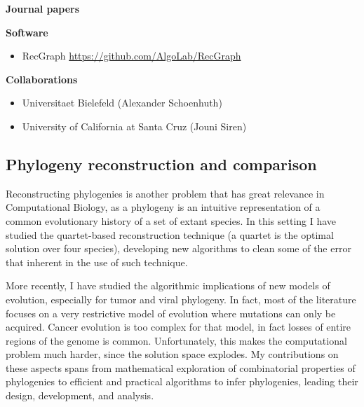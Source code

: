 \documentclass[11pt,a4paper,roman]{moderncv}
\begin{document}
\textbf{Journal papers}

\cite{baaijensComputationalGraphPangenomics2022}
\cite{DBLP:journals/bioinformatics/DentiPPCVRB21}
\cite{DBLP:journals/ipl/BonizzoniVDP10}
\cite{DBLP:journals/tcbb/BonizzoniVDFRV07}
\cite{DBLP:journals/informs/JustV04}
\cite{DBLP:journals/dam/BonizzoniVM01}
\cite{DBLP:journals/tcs/BonizzoniV01}

\textbf{Software}

\begin{itemize}
	\item
	      RecGraph \url{https://github.com/AlgoLab/RecGraph}
\end{itemize}

\textbf{Collaborations}

\begin{itemize}
	\item
	      Universitaet Bielefeld (Alexander Schoenhuth)
	\item
	      University of California at Santa Cruz (Jouni Siren)
\end{itemize}

\subsection{Phylogeny reconstruction and
	comparison}\label{phylogeny-reconstruction-and-comparison}

Reconstructing phylogenies is another problem that has great relevance
in Computational Biology, as a phylogeny is an intuitive representation
of a common evolutionary history of a set of extant species. In this
setting I have studied the quartet-based reconstruction technique (a
quartet is the optimal solution over four species), developing new
algorithms to clean some of the error that inherent in the use of such
technique.

More recently, I have studied the algorithmic implications of new models of
evolution, especially for tumor and viral phylogeny.
In fact, most of the literature focuses on a very restrictive model of evolution
where mutations can only be acquired.
Cancer evolution is too complex for that model, in fact losses of entire regions
of the genome is common.
Unfortunately, this makes the computational problem much harder, since the
solution space explodes.
My contributions on these aspects spans from mathematical exploration of
combinatorial properties of phylogenies to efficient and practical algorithms to
infer phylogenies, leading their design, development, and analysis.
\end{document}

